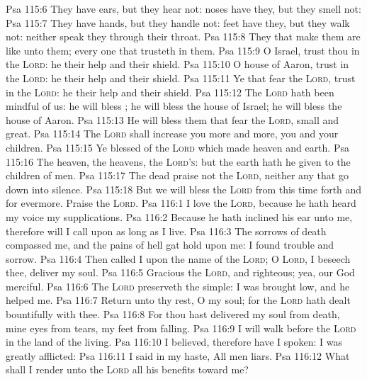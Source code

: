 \vs Psa 115:6 They have ears, but they hear not: noses have they, but they smell not:
\vs Psa 115:7 They have hands, but they handle not: feet have they, but they walk not: neither speak they through their throat.
\vs Psa 115:8 They that make them are like unto them;  every one that trusteth in them.
\vs Psa 115:9 O Israel, trust thou in the \textsc{Lord}: he  their help and their shield.
\vs Psa 115:10 O house of Aaron, trust in the \textsc{Lord}: he  their help and their shield.
\vs Psa 115:11 Ye that fear the \textsc{Lord}, trust in the \textsc{Lord}: he  their help and their shield.
\vs Psa 115:12 The \textsc{Lord} hath been mindful of us: he will bless ; he will bless the house of Israel; he will bless the house of Aaron.
\vs Psa 115:13 He will bless them that fear the \textsc{Lord},  small and great.
\vs Psa 115:14 The \textsc{Lord} shall increase you more and more, you and your children.
\vs Psa 115:15 Ye  blessed of the \textsc{Lord} which made heaven and earth.
\vs Psa 115:16 The heaven,  the heavens,  the \textsc{Lord's}: but the earth hath he given to the children of men.
\vs Psa 115:17 The dead praise not the \textsc{Lord}, neither any that go down into silence.
\vs Psa 115:18 But we will bless the \textsc{Lord} from this time forth and for evermore. Praise the \textsc{Lord}.
\vs Psa 116:1 I love the \textsc{Lord}, because he hath heard my voice  my supplications.
\vs Psa 116:2 Because he hath inclined his ear unto me, therefore will I call upon  as long as I live.
\vs Psa 116:3 The sorrows of death compassed me, and the pains of hell gat hold upon me: I found trouble and sorrow.
\vs Psa 116:4 Then called I upon the name of the \textsc{Lord}; O \textsc{Lord}, I beseech thee, deliver my soul.
\vs Psa 116:5 Gracious  the \textsc{Lord}, and righteous; yea, our God  merciful.
\vs Psa 116:6 The \textsc{Lord} preserveth the simple: I was brought low, and he helped me.
\vs Psa 116:7 Return unto thy rest, O my soul; for the \textsc{Lord} hath dealt bountifully with thee.
\vs Psa 116:8 For thou hast delivered my soul from death, mine eyes from tears,  my feet from falling.
\vs Psa 116:9 I will walk before the \textsc{Lord} in the land of the living.
\vs Psa 116:10 I believed, therefore have I spoken: I was greatly afflicted:
\vs Psa 116:11 I said in my haste, All men  liars.
\vs Psa 116:12 What shall I render unto the \textsc{Lord}  all his benefits toward me?
